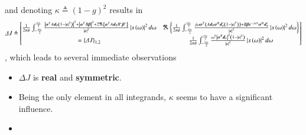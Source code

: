 and denoting $ \kappa \triangleq \left(1-g\right)^{2}$ results in
\\
\resizebox{1.1 \textwidth}{!} 
{
\begin{equation}
    \Delta{J} \triangleq 
    \begin{bmatrix}
        \frac{1}{2\pi\phi}
        \int_{-\frac{\omega_{s}}{2}}^{\frac{\omega_{s}}{2}}
        \frac{
        \left|
        \boldsymbol{\alpha}^{T}A\boldsymbol{d}_{\theta}
        \left(1-\left|\kappa\right|^{2}\right)
        \right|^{2}
        +
        \left|
        \boldsymbol{\alpha}^{T}B\boldsymbol{\beta}
        \right|^{2}
        +2\Re\left\{
        \boldsymbol{\alpha}^{T}A\boldsymbol{d}_{\theta}B^{*}\boldsymbol{\beta}^{*}
        \right\}
        }{
        \left|\kappa\right|^{2}
        }
        \left|
        s\left(\omega\right)
        \right|^{2}
        d\omega
        &
        \Re
        \left\{
        \frac{1}{2\pi\phi}
        \int_{-\frac{\omega_{s}}{2}}^{\frac{\omega_{s}}{2}}
        \frac{
        j\omega\boldsymbol{\alpha}^{T}
        \left(
        A\boldsymbol{d}_{\theta}\boldsymbol{\alpha}^{H}\boldsymbol{d}_{\theta}^{*}\left(1-\left|\kappa\right|^{2}\right)
        \right)
        +
        B\boldsymbol{\beta}e^{-j\omega\tau}\boldsymbol{\alpha}^{H}\boldsymbol{d}_{\theta}^{*}
        }{
        \left|\kappa\right|^{2}
        }
        \left|
        s\left(\omega\right)
        \right|^{2}
        d\omega
        \right\}
        \\
        =\left\{\Delta{J}\right\}_{1,2}
        & 
        \frac{1}{2\pi\phi}
        \int_{-\frac{\omega_{s}}{2}}^{\frac{\omega_{s}}{2}}
        \frac{
        \omega^{2}
        \left|
        \boldsymbol{\alpha^{T}}\boldsymbol{d}_{\theta}
        \right|^{2}
        \left(1-\left|\kappa\right|^{2}\right)
        }{
        \left|\kappa\right|^{2}
        }
        \left|
        s\left(\omega\right)
        \right|^{2}
        d\omega
        \\
    \end{bmatrix}
\end{equation}
}
, which leads to several immediate observations
\begin{itemize}
    \item $\Delta{J}$ is \textbf{real} and \textbf{symmetric}.
    \item Being the only element in all integrands, $\kappa$ seems to have a significant influence.
    \item 
\end{itemize}